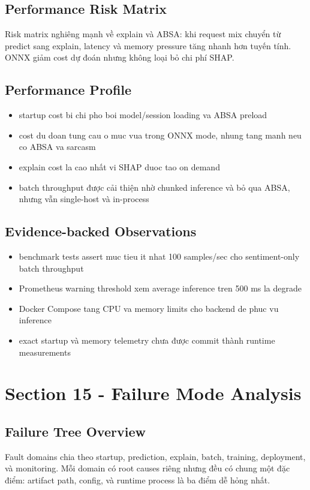\subsection{Performance Risk Matrix}
Risk matrix nghiêng mạnh về explain và ABSA: khi request mix chuyển từ predict sang explain, latency và memory pressure tăng nhanh hơn tuyến tính. ONNX giảm cost dự đoán nhưng không loại bỏ chi phí SHAP.

\subsection{Performance Profile}
\begin{itemize}[leftmargin=1.2em]
  \item startup cost bi chi pho boi model/session loading va ABSA preload
  \item cost du doan tung cau o muc vua trong ONNX mode, nhung tang manh neu co ABSA va sarcasm
  \item explain cost la cao nhất vi SHAP duoc tao on demand
  \item batch throughput được cải thiện nhờ chunked inference và bỏ qua ABSA, nhưng vẫn single-host và in-process
\end{itemize}

\subsection{Evidence-backed Observations}
\begin{itemize}[leftmargin=1.2em]
  \item benchmark tests assert muc tieu it nhat 100 samples/sec cho sentiment-only batch throughput
  \item Prometheus warning threshold xem average inference tren 500 ms la degrade
  \item Docker Compose tang CPU va memory limits cho backend de phuc vu inference
  \item exact startup và memory telemetry chưa được commit thành runtime measurements
\end{itemize}

\section{Section 15 - Failure Mode Analysis}
\subsection{Failure Tree Overview}
Fault domains chia theo startup, prediction, explain, batch, training, deployment, và monitoring. Mỗi domain có root causes riêng nhưng đều có chung một đặc điểm: artifact path, config, và runtime process là ba điểm dễ hỏng nhất.

